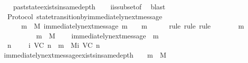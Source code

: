 \begin{isabellebody}
\ \ \isamarkupfalse%
\ past{\isacharunderscore}state{\isacharunderscore}exists{\isacharunderscore}in{\isacharunderscore}same{\isacharunderscore}depth\isanewline
\ \ \isamarkupfalse%
\ {\isasymSigma}i{\isacharunderscore}is{\isacharunderscore}subset{\isacharunderscore}of{\isacharunderscore}{\isasymSigma}\ \isamarkupfalse%
\ blast%
\endisatagproof
{\isafoldproof}%
%
\isadelimproof
\isanewline
%
\endisadelimproof
\isanewline
{}\isamarkupfalse%
\ {\isacharparenleft}\ Protocol{\isacharparenright}\ state{\isacharunderscore}transition{\isacharunderscore}by{\isacharunderscore}immediately{\isacharunderscore}next{\isacharunderscore}message{\isacharcolon}\ \isanewline
\ \ {\isachardoublequoteopen}{\isasymforall}\ {\isasymsigma}\ {\isasymin}{\isasymSigma}{\isachardot}\ {\isasymforall}\ m\ {\isasymin}\ M{\isachardot}\ immediately{\isacharunderscore}next{\isacharunderscore}message\ {\isacharparenleft}{\isasymsigma}{\isacharcomma}m{\isacharparenright}\ {\isasymlongrightarrow}\ {\isasymsigma}\ {\isasymunion}\ {\isacharbraceleft}m{\isacharbraceright}\ {\isasymin}\ {\isasymSigma}{\isachardoublequoteclose}\isanewline
%
\isadelimproof
\ \ %
\endisadelimproof
%
\isatagproof
{}\isamarkupfalse%
\ {\isacharparenleft}rule{\isacharcomma}\ rule{\isacharcomma}\ rule{\isacharparenright}\isanewline
{}\isamarkupfalse%
\ {\isacharminus}\ \isanewline
\ \ \isamarkupfalse%
\ {\isasymsigma}\ m\isanewline
\ \ \isamarkupfalse%
\ {\isachardoublequoteopen}{\isasymsigma}\ {\isasymin}\ {\isasymSigma}{\isachardoublequoteclose}\ \isanewline
\ \ \ {\isachardoublequoteopen}m\ {\isasymin}\ M{\isachardoublequoteclose}\ \isanewline
\ \ \ {\isachardoublequoteopen}immediately{\isacharunderscore}next{\isacharunderscore}message\ {\isacharparenleft}{\isasymsigma}{\isacharcomma}\ m{\isacharparenright}{\isachardoublequoteclose}\ \isanewline
\ \ \isamarkupfalse%
\ \isamarkupfalse%
\ {\isachardoublequoteopen}{\isacharparenleft}{\isasymexists}\ n\ {\isasymin}\ {\isasymnat}{\isachardot}\ {\isasymsigma}\ {\isasymin}\ {\isasymSigma}{\isacharunderscore}i\ {\isacharparenleft}V{\isacharcomma}C{\isacharcomma}{\isasymepsilon}{\isacharparenright}\ n\ {\isasymand}\ m\ {\isasymin}\ M{\isacharunderscore}i\ {\isacharparenleft}V{\isacharcomma}C{\isacharcomma}{\isasymepsilon}{\isacharparenright}\ n{\isacharparenright}{\isachardoublequoteclose}\isanewline
\ \ \ \ \isamarkupfalse%
\ immediately{\isacharunderscore}next{\isacharunderscore}message{\isacharunderscore}exists{\isacharunderscore}in{\isacharunderscore}same{\isacharunderscore}depth\ {\isacartoucheopen}{\isasymsigma}\ {\isasymin}\ {\isasymSigma}{\isacartoucheclose}\ {\isacartoucheopen}m\ {\isasymin}\ M{\isacartoucheclose}\isanewline

\end{isabellebody}
